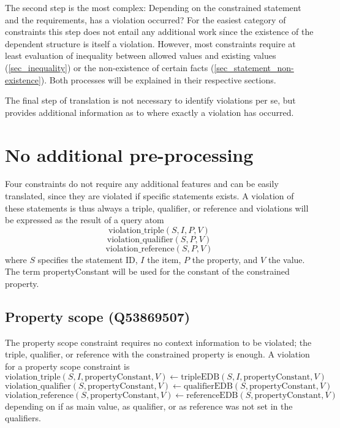 \documentclass[hyperref,bachelorofscience,fleqn]{cgvpub}
\begin{document}
The second step is the most complex: Depending on the constrained statement and the requirements, has a violation occurred? For the easiest category of constraints this step does not entail any additional work since the existence of the dependent structure is itself a violation. However, most constraints require at least evaluation of inequality between allowed values and existing values (\ref{sec_inequality}) or the non-existence of certain facts (\ref{sec_statement_non-existence}). Both processes will be explained in their respective sections.

The final step of translation is not necessary to identify violations per se, but provides additional information as to where exactly a violation has occurred. 

\section{No additional pre-processing}\label{sec_no_preprocessing}
Four constraints do not require any additional features and can be easily translated, since they are violated if specific statements exists. A violation of these statements is thus always a triple, qualifier, or reference and violations will be expressed as the result of a query atom
\[\text{violation\_triple}(S, I, P, V)\]
\[\text{violation\_qualifier}(S, P, V)\]
\[\text{violation\_reference}(S, P, V)\]
where \(S\) specifies the statement ID, \(I\) the item, \(P\) the property, and \(V\) the value. The term propertyConstant will be used for the constant of the constrained property.

\subsection{Property scope (Q53869507)}
The property scope constraint requires no context information to be violated; the triple, qualifier, or reference with the constrained property is enough.
A violation for a property scope constraint is
\[\text{violation\_triple}(S, I, \text{propertyConstant}, V) \leftarrow \text{tripleEDB}(S, I, \text{propertyConstant}, V)\]
\[\text{violation\_qualifier}(S, \text{propertyConstant}, V) \leftarrow \text{qualifierEDB}(S, \text{propertyConstant}, V)\]
\[\text{violation\_reference}(S, \text{propertyConstant}, V) \leftarrow \text{referenceEDB}(S, \text{propertyConstant}, V)\]
depending on if as main value, as qualifier, or as reference was not set in the qualifiers.\\
\end{document}
